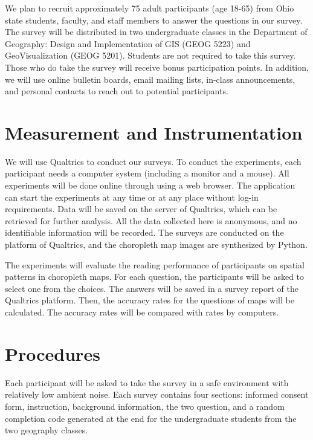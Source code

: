We plan to recruit approximately 75 adult participants (age 18-65) from Ohio state students, faculty, and staff members to answer the questions in our survey. The survey will be distributed in two undergraduate classes in the Department of Geography: Design and Implementation of GIS (GEOG 5223) and GeoVisualization (GEOG 5201). Students are not required to take this survey. Those who do take the survey will receive bonus participation points. In addition, we will use online bulletin boards, email mailing lists, in-class announcements, and personal contacts to reach out to potential participants. 

\section{Measurement and Instrumentation}

We will use Qualtrics to conduct our surveys. To conduct the experiments, each participant needs a computer system (including a monitor and a mouse). All experiments will be done online through using a web browser. The application can start the experiments at any time or at any place without log-in requirements. Data will be saved on the server of Qualtrics, which can be retrieved for further analysis. All the data collected here is anonymous, and no identifiable information will be recorded. The surveys are conducted on the platform of Qualtrics, and the choropleth map images are synthesized by Python. 

The experiments will evaluate the reading performance of participants on spatial patterns in choropleth maps. For each question, the participants will be asked to select one from the choices. The answers will be saved in a survey report of the Qualtrics platform. Then, the accuracy rates for the questions of maps will be calculated. The accuracy rates will be compared with rates by computers.

\section{Procedures}

Each participant will be asked to take the survey in a safe environment with relatively low ambient noise. Each survey contains four sections: informed consent form, instruction, background information, the two question, and a random completion code generated at the end for the undergraduate students from the two geography classes.

